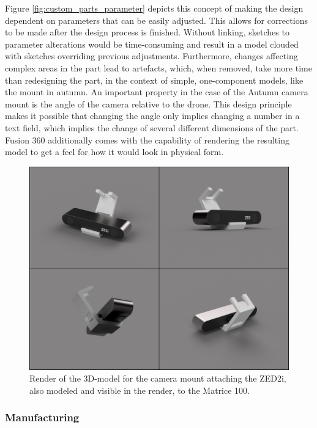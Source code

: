 Figure \ref{fig:custom_parts_parameter} depicts this concept of making the design dependent on parameters that can be easily adjusted. This allows for corrections to be made after the design process is finished. Without linking, sketches to parameter alterations would be time-consuming and result in a model clouded with sketches overriding previous adjustments. Furthermore, changes affecting complex areas in the part lead to artefacts, which, when removed, take more time than redesigning the part, in the context of simple, one-component models, like the mount in autumn. An important property in the case of the Autumn camera mount is the angle of the camera relative to the drone. This design principle makes it possible that changing the angle only implies changing a number in a text field, which implies the change of several different dimensions of the part. 
Fusion 360 additionally comes with the capability of rendering the resulting model to get a feel for how it would look in physical form.

\begin{figure}[h]
	\centering
	\includegraphics[width=0.6\linewidth]{img/MountRender}
	\caption{Render of the 3D-model for the camera mount attaching the ZED2i, also modeled and visible in the render, to the Matrice 100.}
	\label{fig:custom_parts_mountRender}
\end{figure}

\subsubsection{Manufacturing}

